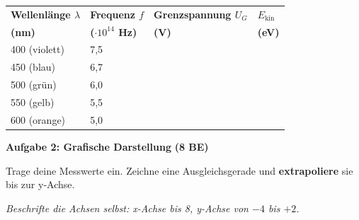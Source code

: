 \documentclass[11pt,a4paper]{article}
\begin{document}
\begin{center}
\begin{tabular}{|p{3.5cm}|p{3cm}|p{4cm}|p{4cm}|}
\hline
\textbf{Wellenlänge $\lambda$} & \textbf{Frequenz $f$} & \textbf{Grenzspannung $U_G$} & \textbf{$E_{\text{kin}}$} \\
\textbf{(nm)} & \textbf{($\cdot 10^{14}$ Hz)} & \textbf{(V)} & \textbf{(eV)} \\
\hline
400 (violett) & 7,5 & & \\[1.2em]
\hline
450 (blau) & 6,7 & & \\[1.2em]
\hline
500 (grün) & 6,0 & & \\[1.2em]
\hline
550 (gelb) & 5,5 & & \\[1.2em]
\hline
600 (orange) & 5,0 & & \\[1.2em]
\hline
\end{tabular}
\end{center}

\vspace{0.5em}


\textbf{Aufgabe 2: Grafische Darstellung} \hfill \textbf{(8 BE)}

Trage deine Messwerte ein. Zeichne eine Ausgleichsgerade und \textbf{extrapoliere} sie bis zur y-Achse.

\textit{Beschrifte die Achsen selbst: x-Achse bis 8, y-Achse von $-4$ bis $+2$.}

\vspace{0.3em}

\begin{center}
\end{center}
\end{document}
